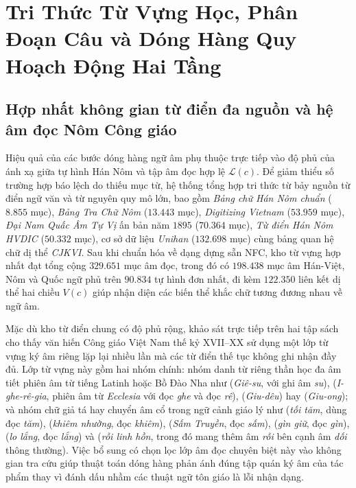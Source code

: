 \section{Tri Thức Từ Vựng Học, Phân Đoạn Câu và Dóng Hàng Quy Hoạch Động Hai Tầng}

\subsection{Hợp nhất không gian từ điển đa nguồn và hệ âm đọc Nôm Công giáo}

Hiệu quả của các bước dóng hàng ngữ âm phụ thuộc trực tiếp vào độ phủ của ánh xạ giữa tự hình Hán Nôm và tập âm đọc hợp lệ $\mathcal{L}(c)$. Để giảm thiểu số trường hợp báo lệch do thiếu mục từ, hệ thống tổng hợp tri thức từ bảy nguồn từ điển ngữ văn và từ nguyên quy mô lớn, bao gồm \textit{Bảng chữ Hán Nôm chuẩn} ($8.855$ mục), \textit{Bảng Tra Chữ Nôm} ($13.443$ mục), \textit{Digitizing Vietnam} ($53.959$ mục), \textit{Đại Nam Quấc Âm Tự Vị} ấn bản năm $1895$ \cite{huinhtinh1895} ($70.364$ mục), \textit{Từ điển Hán Nôm HVDIC} ($50.332$ mục), cơ sở dữ liệu \textit{Unihan} \cite{unihan2025} ($132.698$ mục) cùng bảng quan hệ chữ dị thể \textit{CJKVI}. Sau khi chuẩn hóa về dạng dựng sẵn NFC, kho từ vựng hợp nhất đạt tổng cộng $329.651$ mục âm đọc, trong đó có $198.438$ mục âm Hán-Việt, Nôm và Quốc ngữ phủ trên $90.834$ tự hình đơn nhất, đi kèm $122.350$ liên kết dị thể hai chiều $V(c)$ giúp nhận diện các biến thể khắc chữ tương đương nhau về ngữ âm.

Mặc dù kho từ điển chung có độ phủ rộng, khảo sát trực tiếp trên hai tập sách cho thấy văn hiến Công giáo Việt Nam thế kỷ XVII--XX sử dụng một lớp từ vựng ký âm riêng lặp lại nhiều lần mà các từ điển thế tục không ghi nhận đầy đủ. Lớp từ vựng này gồm hai nhóm chính: nhóm danh từ riêng thần học đa âm tiết phiên âm từ tiếng Latinh hoặc Bồ Đào Nha như  (\textit{Giê-su}, với  ghi âm \textit{su}),  (\textit{I-ghe-rê-gia}, phiên âm từ \textit{Ecclesia} với  đọc \textit{ghe} và  đọc \textit{rê}),  (\textit{Giu-dêu}) hay  (\textit{Giu-ong}); và nhóm chữ giả tá hay chuyển âm cổ trong ngữ cảnh giáo lý như  (\textit{tối tăm}, dùng  đọc \textit{tăm}),  (\textit{khiêm nhường},  đọc \textit{khiêm}),  (\textit{Sấm Truyền},  đọc \textit{sấm}),  (\textit{gìn giữ},  đọc \textit{gìn}),  (\textit{lo lắng},  đọc \textit{lắng}) và  (\textit{rỗi linh hồn}, trong đó  mang thêm âm \textit{rỗi} bên cạnh âm \textit{dối} thông thường). Việc bổ sung có chọn lọc lớp âm đọc chuyên biệt này vào không gian tra cứu giúp thuật toán dóng hàng phản ánh đúng tập quán ký âm của tác phẩm thay vì đánh dấu nhầm các thuật ngữ tôn giáo là lỗi nhận dạng.

